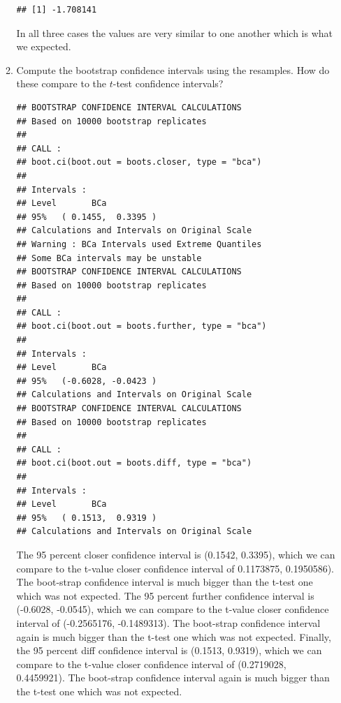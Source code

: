 \documentclass{article}\usepackage[]{graphicx}\usepackage[]{xcolor}
\makeatletter
\newenvironment{kframe}{%
 \def\at@end@of@kframe{}%
 \ifinner\ifhmode%
  \def\at@end@of@kframe{\end{minipage}}%
  \begin{minipage}{\columnwidth}%
 \fi\fi%
 \def\FrameCommand##1{\hskip\@totalleftmargin \hskip-\fboxsep
 \colorbox{shadecolor}{##1}\hskip-\fboxsep
     \hskip-\linewidth \hskip-\@totalleftmargin \hskip\columnwidth}%
 \MakeFramed {\advance\hsize-\width
   \@totalleftmargin\z@ \linewidth\hsize
   \@setminipage}}%
 {\par\unskip\endMakeFramed%
 \at@end@of@kframe}
\newenvironment{knitrout}{}{} %
\makeatother
\begin{document}
\begin{enumerate}
\begin{enumerate}
\begin{knitrout}
\begin{kframe}
\begin{verbatim}
## [1] -1.708141
\end{verbatim}
\end{kframe}
\end{knitrout}
In all three cases the values are very similar to one another which is what we expected.
  \item Compute the bootstrap confidence intervals using the resamples. How do these 
  compare to the $t$-test confidence intervals?
\begin{knitrout}
\color{fgcolor}\begin{kframe}
\begin{verbatim}
## BOOTSTRAP CONFIDENCE INTERVAL CALCULATIONS
## Based on 10000 bootstrap replicates
## 
## CALL : 
## boot.ci(boot.out = boots.closer, type = "bca")
## 
## Intervals : 
## Level       BCa          
## 95%   ( 0.1455,  0.3395 )  
## Calculations and Intervals on Original Scale
## Warning : BCa Intervals used Extreme Quantiles
## Some BCa intervals may be unstable
## BOOTSTRAP CONFIDENCE INTERVAL CALCULATIONS
## Based on 10000 bootstrap replicates
## 
## CALL : 
## boot.ci(boot.out = boots.further, type = "bca")
## 
## Intervals : 
## Level       BCa          
## 95%   (-0.6028, -0.0423 )  
## Calculations and Intervals on Original Scale
## BOOTSTRAP CONFIDENCE INTERVAL CALCULATIONS
## Based on 10000 bootstrap replicates
## 
## CALL : 
## boot.ci(boot.out = boots.diff, type = "bca")
## 
## Intervals : 
## Level       BCa          
## 95%   ( 0.1513,  0.9319 )  
## Calculations and Intervals on Original Scale
\end{verbatim}
\end{kframe}
\end{knitrout}
The 95 percent closer confidence interval is (0.1542, 0.3395), which we can compare to the t-value closer confidence interval of 0.1173875, 0.1950586). The boot-strap confidence interval is much bigger than the t-test one which was not expected. The 95 percent further confidence interval is (-0.6028, -0.0545), which we can compare to the t-value closer confidence interval of (-0.2565176, -0.1489313). The boot-strap confidence interval again is much bigger than the t-test one which was not expected. Finally, the 95 percent diff confidence interval is (0.1513, 0.9319), which we can compare to the t-value closer confidence interval of (0.2719028, 0.4459921). The boot-strap confidence interval again is much bigger than the t-test one which was not expected.


\end{enumerate}
\end{enumerate}
\end{document}
